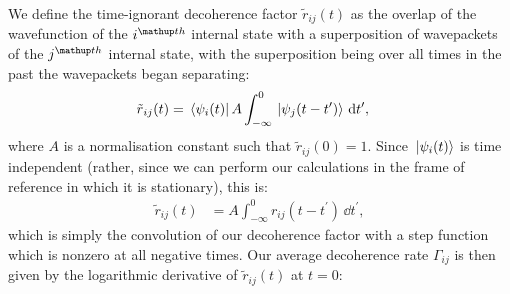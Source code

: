 We define the time-ignorant decoherence factor $\tilde r_{ij}(t)$ as the overlap of the wavefunction of the $i^\up{th}$ internal state with a superposition of wavepackets of the $j^\up{th}$ internal state, with the superposition being over all times in the past the wavepackets began separating:
\begin{align}
\tilde r_{ij}(t) &= \bra{\psi_i(t)} A\int_{-\infty}^0 \ket{\psi_j(t - t^\prime)} \,\dd t^\prime,
\end{align}
where $A$ is a normalisation constant such that $\tilde r_{ij}(0) = 1$.
Since $\ket{\psi_i(t)}$ is time independent (rather, since we can perform our calculations in the frame of reference in which it is stationary), this is:
\begin{align}
\tilde r_{ij}(t) &= A\int_{-\infty}^0 r_{ij}(t - t^\prime) \,\dd t^\prime,
\end{align}
which is simply the convolution of our decoherence factor with a step function which is nonzero at all negative times.
Our average decoherence rate $\Gamma_{ij}$ is then given by the logarithmic derivative of $\tilde r_{ij}(t)$ at $t=0$:

